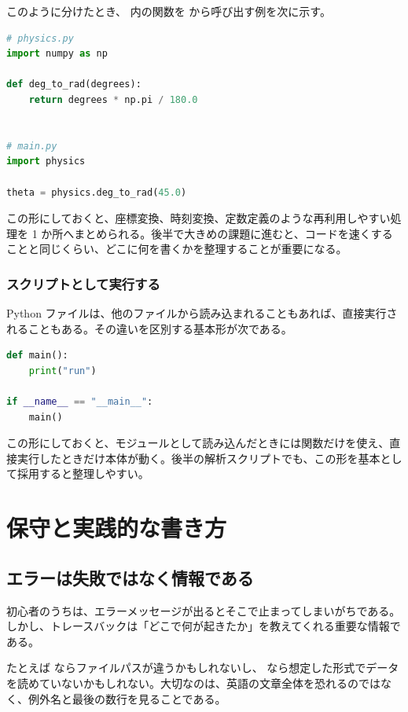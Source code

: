 このように分けたとき、 内の関数を  から呼び出す例を次に示す。

\begin{lstlisting}[language=Python]
# physics.py
import numpy as np

def deg_to_rad(degrees):
    return degrees * np.pi / 180.0


# main.py
import physics

theta = physics.deg_to_rad(45.0)
\end{lstlisting}

この形にしておくと、座標変換、時刻変換、定数定義のような再利用しやすい処理を 1 か所へまとめられる。後半で大きめの課題に進むと、コードを速くすることと同じくらい、どこに何を書くかを整理することが重要になる。

\subsubsection{スクリプトとして実行する}

Python ファイルは、他のファイルから読み込まれることもあれば、直接実行されることもある。その違いを区別する基本形が次である。

\begin{lstlisting}[language=Python]
def main():
    print("run")

if __name__ == "__main__":
    main()
\end{lstlisting}

この形にしておくと、モジュールとして読み込んだときには関数だけを使え、直接実行したときだけ本体が動く。後半の解析スクリプトでも、この形を基本として採用すると整理しやすい。

\section{保守と実践的な書き方}

\subsection{エラーは失敗ではなく情報である}

初心者のうちは、エラーメッセージが出るとそこで止まってしまいがちである。しかし、トレースバックは「どこで何が起きたか」を教えてくれる重要な情報である。

たとえば  ならファイルパスが違うかもしれないし、 なら想定した形式でデータを読めていないかもしれない。大切なのは、英語の文章全体を恐れるのではなく、例外名と最後の数行を見ることである。

